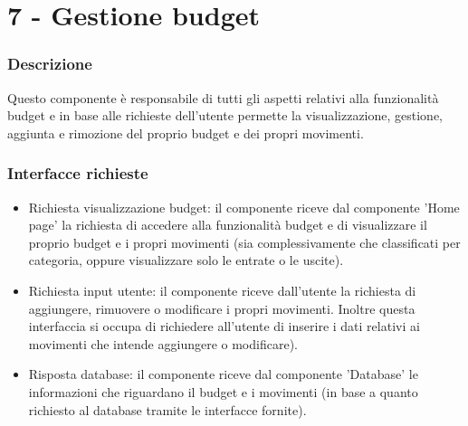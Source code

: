 \documentclass[a4paper,12pt]{article}
\begin{document}
\section*{7 -  Gestione budget}
\subsubsection*{Descrizione}
Questo componente è responsabile di tutti gli aspetti relativi alla funzionalità budget e in base alle richieste dell'utente permette la visualizzazione, gestione, aggiunta e rimozione del proprio budget e dei propri movimenti.
\subsubsection*{Interfacce richieste}
\begin{itemize} \setlength\itemsep{0.01em}
\item {\sffamily Richiesta visualizzazione budget}: il componente riceve dal componente 'Home page'  la richiesta di accedere alla funzionalità budget e di visualizzare il proprio budget e i propri movimenti (sia complessivamente che classificati per categoria, oppure visualizzare solo le entrate o le uscite).
\item {\sffamily Richiesta input utente}: il componente riceve dall'utente la richiesta di aggiungere, rimuovere o modificare i propri movimenti. Inoltre questa interfaccia si occupa di richiedere all'utente di inserire i dati relativi ai movimenti che intende aggiungere o modificare).
\item {\sffamily Risposta database}: il componente riceve dal componente 'Database' le informazioni che riguardano il budget e i movimenti (in base a quanto richiesto al database tramite le interfacce fornite).
\end{itemize}
\end{document}
